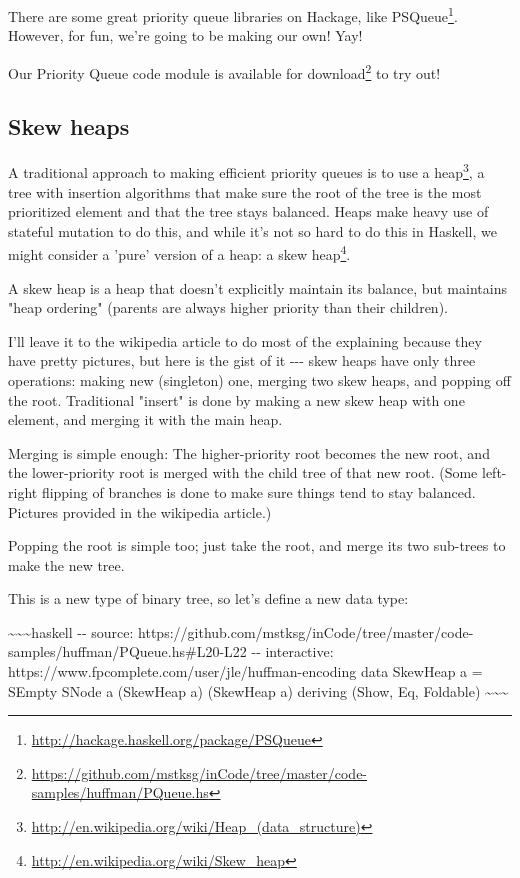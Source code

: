 \documentclass[]{article}
\renewcommand{\href}[2]{#2\footnote{\url{#1}}}
\begin{document}
There are some great priority queue libraries on Hackage, like
\href{http://hackage.haskell.org/package/PSQueue}{PSQueue}. However, for fun,
we're going to be making our own! Yay!

Our Priority Queue code module is
\href{https://github.com/mstksg/inCode/tree/master/code-samples/huffman/PQueue.hs}{available
for download} to try out!

\subsection{Skew heaps}

A traditional approach to making efficient priority queues is to use a
\href{http://en.wikipedia.org/wiki/Heap_(data_structure)}{heap}, a tree with
insertion algorithms that make sure the root of the tree is the most prioritized
element and that the tree stays balanced. Heaps make heavy use of stateful
mutation to do this, and while it's not so hard to do this in Haskell, we might
consider a 'pure' version of a heap: a
\href{http://en.wikipedia.org/wiki/Skew_heap}{skew heap}.

A skew heap is a heap that doesn't explicitly maintain its balance, but
maintains "heap ordering" (parents are always higher priority than their
children).

I'll leave it to the wikipedia article to do most of the explaining because they
have pretty pictures, but here is the gist of it -\/-\/- skew heaps have only
three operations: making new (singleton) one, merging two skew heaps, and
popping off the root. Traditional "insert" is done by making a new skew heap
with one element, and merging it with the main heap.

Merging is simple enough: The higher-priority root becomes the new root, and the
lower-priority root is merged with the child tree of that new root. (Some
left-right flipping of branches is done to make sure things tend to stay
balanced. Pictures provided in the wikipedia article.)

Popping the root is simple too; just take the root, and merge its two sub-trees
to make the new tree.

This is a new type of binary tree, so let's define a new data type:

\textasciitilde{}\textasciitilde{}\textasciitilde{}haskell -\/- source:
https://github.com/mstksg/inCode/tree/master/code-samples/huffman/PQueue.hs\#L20-L22
-\/- interactive: https://www.fpcomplete.com/user/jle/huffman-encoding data
SkewHeap a = SEmpty \textbar{} SNode a (SkewHeap a) (SkewHeap a) deriving (Show,
Eq, Foldable) \textasciitilde{}\textasciitilde{}\textasciitilde{}
\end{document}

